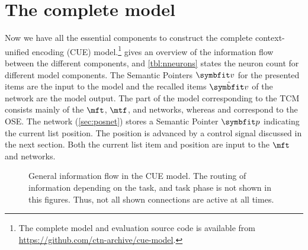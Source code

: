 \chapter{The complete model}

Now we have all the essential components to construct the complete context-unified encoding (CUE) model.\footnote{The complete model and evaluation source code is available from \url{https://github.com/ctn-archive/cue-model}.}
 gives an overview of the information flow between the different components, and \cref{tbl:nneurons} states the neuron count for different model components.
The Semantic Pointers $\vc v$ for the presented items are the input to the model and the recalled items $\hat{\vc v}$ of the  network are the model output.
The part of the model corresponding to the TCM consists mainly of the $\mft$, $\mtf$, and  networks, whereas  and  correspond to the OSE\@.
The  network (\cref{sec:posnet}) stores a Semantic Pointer $\vc p$ indicating the current list position.
The position is advanced by a control signal discussed in the next section.
Both the current list item and position are input to the $\mft$ and  networks.
\begin{figure}
    \centering
    \caption[General information flow in the CUE model.]{General information flow in the CUE model. The routing of information depending on the task, and task phase is not shown in this figures. Thus, not all shown connections are active at all times.}\label{fig:general-routing}
\end{figure}
